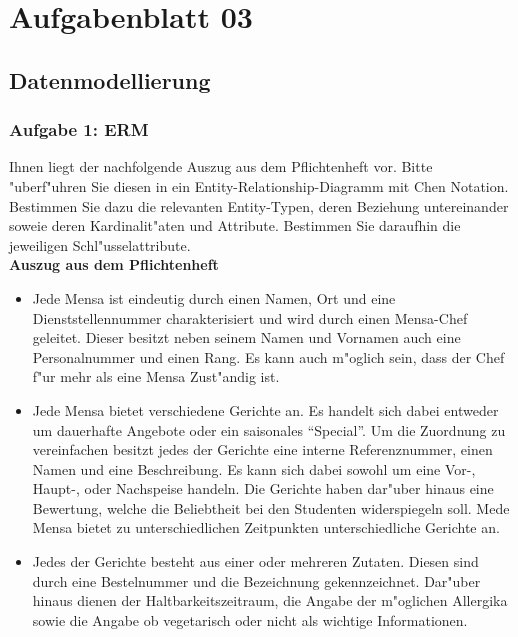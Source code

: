 
\chapter{Aufgabenblatt 03}


\section{Datenmodellierung}

\subsection{Aufgabe 1: ERM}

Ihnen liegt der nachfolgende Auszug aus dem Pflichtenheft vor. Bitte "uberf"uhren Sie diesen in ein Entity-Relationship-Diagramm mit Chen Notation.
Bestimmen Sie dazu die relevanten Entity-Typen, deren Beziehung untereinander soweie deren Kardinalit"aten und Attribute.
Bestimmen Sie daraufhin die jeweiligen Schl"usselattribute.\\

\textbf{Auszug aus dem Pflichtenheft}
\begin{itemize}
    \item Jede Mensa ist eindeutig durch einen Namen, Ort und eine Dienststellennummer charakterisiert und wird durch einen Mensa-Chef geleitet.
    Dieser besitzt neben seinem Namen und Vornamen auch eine Personalnummer und einen Rang.
    Es kann auch m"oglich sein, dass der Chef f"ur mehr als eine Mensa Zust"andig ist.
    \item Jede Mensa bietet verschiedene Gerichte an.
    Es handelt sich dabei entweder um dauerhafte Angebote oder ein saisonales "`Special"'.
    Um die Zuordnung zu vereinfachen besitzt jedes der Gerichte eine interne Referenznummer, einen Namen und eine Beschreibung.
    Es kann sich dabei sowohl um eine Vor-, Haupt-, oder Nachspeise handeln.
    Die Gerichte haben dar"uber hinaus eine Bewertung, welche die Beliebtheit bei den Studenten widerspiegeln soll.
    Mede Mensa bietet zu unterschiedlichen Zeitpunkten unterschiedliche Gerichte an.
    \item Jedes der Gerichte besteht aus einer oder mehreren Zutaten.
    Diesen sind durch eine Bestelnummer und die Bezeichnung gekennzeichnet.
    Dar"uber hinaus dienen der Haltbarkeitszeitraum, die Angabe der m"oglichen Allergika sowie die Angabe ob vegetarisch oder nicht als wichtige Informationen.
\end{itemize}

